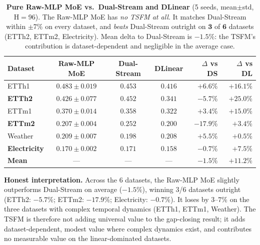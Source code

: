 \documentclass{article}
\begin{document}
\begin{table}[!htbp]
\centering
\caption{\textbf{Pure Raw-MLP MoE vs.\ Dual-Stream and DLinear} (5 seeds, mean$\pm$std, H$=$96). The Raw-MLP MoE has \emph{no TSFM at all}. It matches Dual-Stream within $\pm 7\%$ on every dataset, and \emph{beats} Dual-Stream outright on $\mathbf{3}$ of $\mathbf{6}$ datasets (ETTh2, ETTm2, Electricity). Mean delta to Dual-Stream is $-1.5\%$: the TSFM's contribution is dataset-dependent and negligible in the average case.}
\label{tab:raw_mlp_moe}
\footnotesize
\begin{tabular}{@{}lcccrr@{}}
\toprule
Dataset & Raw-MLP MoE & Dual-Stream & DLinear & $\Delta$ vs DS & $\Delta$ vs DL \\
\midrule
ETTh1       & $0.483 \pm 0.019$ & $\mathit{0.453}$ & $\mathit{0.416}$ & $+6.6\%$ & $+16.1\%$ \\
\textbf{ETTh2}       & $\mathbf{0.426 \pm 0.077}$ & $\mathit{0.452}$ & $\mathit{0.341}$ & $\mathbf{-5.7\%}$ & $+25.0\%$ \\
ETTm1       & $0.370 \pm 0.014$ & $\mathit{0.358}$ & $\mathit{0.322}$ & $+3.4\%$ & $+15.0\%$ \\
\textbf{ETTm2}       & $\mathbf{0.207 \pm 0.004}$ & $\mathit{0.252}$ & $\mathit{0.200}$ & $\mathbf{-17.9\%}$ & $+3.4\%$ \\
Weather     & $0.209 \pm 0.007$ & $\mathit{0.198}$ & $\mathit{0.208}$ & $+5.5\%$ & $+0.5\%$ \\
\textbf{Electricity} & $\mathbf{0.170 \pm 0.002}$ & $\mathit{0.171}$ & $\mathit{0.158}$ & $\mathbf{-0.7\%}$ & $+7.5\%$ \\
\midrule
\textbf{Mean}        & --- & --- & --- & $\mathbf{-1.5\%}$ & $\mathbf{+11.2\%}$ \\
\bottomrule
\end{tabular}
\end{table}

\textbf{Honest interpretation.} Across the 6 datasets, the Raw-MLP MoE slightly outperforms Dual-Stream on average ($-1.5\%$), winning 3/6 datasets outright (ETTh2: $-5.7\%$; ETTm2: $-17.9\%$; Electricity: $-0.7\%$). It loses by $3$--$7\%$ on the three datasets with complex temporal dynamics (ETTh1, ETTm1, Weather). The TSFM is therefore not adding universal value to the gap-closing result; it adds dataset-dependent, modest value where complex dynamics exist, and contributes no measurable value on the linear-dominated datasets.
\end{document}
